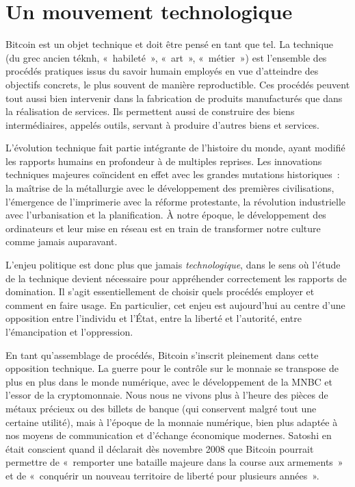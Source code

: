 
\chapter{Un mouvement technologique}
\label{ch:cypherpunks}

Bitcoin est un objet technique et doit être pensé en tant que tel. La technique (du grec ancien \foreignlanguage{greek}{téknh}, «~habileté~», «~art~», «~métier~») est l'ensemble des procédés pratiques issus du savoir humain employés en vue d'atteindre des objectifs concrets, le plus souvent de manière reproductible. Ces procédés peuvent tout aussi bien intervenir dans la fabrication de produits manufacturés que dans la réalisation de services. Ils permettent aussi de construire des biens intermédiaires, appelés outils, servant à produire d'autres biens et services.

L'évolution technique fait partie intégrante de l'histoire du monde, ayant modifié les rapports humains en profondeur à de multiples reprises. Les innovations techniques majeures coïncident en effet avec les grandes mutations historiques~: la maîtrise de la métallurgie avec le développement des premières civilisations, l'émergence de l'imprimerie avec la réforme protestante, la révolution industrielle avec l'urbanisation et la planification. À notre époque, le développement des ordinateurs et leur mise en réseau est en train de transformer notre culture comme jamais auparavant.

L'enjeu politique est donc plus que jamais \emph{technologique}, dans le sens où l'étude de la technique devient nécessaire pour appréhender correctement les rapports de domination. Il s'agit essentiellement de choisir quels procédés employer et comment en faire usage.  En particulier, cet enjeu est aujourd'hui au centre d'une opposition entre l'individu et l'État, entre la liberté et l'autorité, entre l'émancipation et l'oppression.

En tant qu'assemblage de procédés, Bitcoin s'inscrit pleinement dans cette opposition technique. La guerre pour le contrôle sur le monnaie se transpose de plus en plus dans le monde numérique, avec le développement de la MNBC et l'essor de la cryptomonnaie. Nous nous ne vivons plus à l'heure des pièces de métaux précieux ou des billets de banque (qui conservent malgré tout une certaine utilité), mais à l'époque de la monnaie numérique, bien plus adaptée à nos moyens de communication et d'échange économique modernes. Satoshi en était conscient quand il déclarait dès novembre 2008 que Bitcoin pourrait permettre de «~remporter une bataille majeure dans la course aux armements~» et de «~conquérir un nouveau territoire de liberté pour plusieurs années~».

